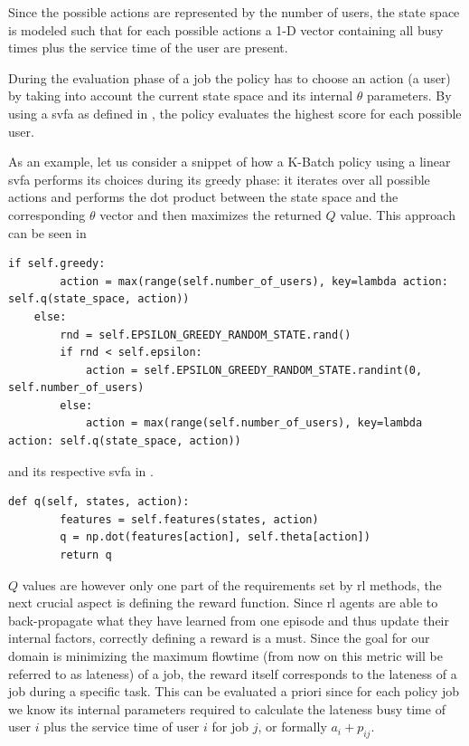 Since the possible actions are represented by the number of users, the state space is modeled such that for each possible actions a 1-D vector containing all busy times plus the service time of the user are present.

During the evaluation phase of a job the policy has to choose an action (\ie a user) by taking into account the current state space and its internal $\theta$ parameters. By using a \gls{svfa} as defined in , the policy evaluates the highest score for each possible user.

As an example, let us consider a snippet of how a K-Batch policy using a linear \gls{svfa} performs its choices during its greedy phase: it iterates over all possible actions and performs the dot product between the state space and the corresponding $\theta$ vector and then maximizes the returned $Q$ value. This approach can be seen in  

\begin{lstlisting}[caption=\gls{ep} approach,label=lst:e_greedy,style=CustomPython]
    if self.greedy:
        action = max(range(self.number_of_users), key=lambda action: self.q(state_space, action))
    else:
        rnd = self.EPSILON_GREEDY_RANDOM_STATE.rand()
        if rnd < self.epsilon:
            action = self.EPSILON_GREEDY_RANDOM_STATE.randint(0, self.number_of_users)
        else:
            action = max(range(self.number_of_users), key=lambda action: self.q(state_space, action))
\end{lstlisting}

and its respective \gls{svfa} in .

\begin{lstlisting}[caption=\glsentryfull{svfa},label=lst:value_f_approx,style=CustomPython]
    def q(self, states, action):
        features = self.features(states, action)
        q = np.dot(features[action], self.theta[action])
        return q
\end{lstlisting}
 
 $Q$ values are however only one part of the requirements set by \gls{rl} methods, the next crucial aspect is defining the reward function. Since \gls{rl} agents are able to back-propagate what they have learned from one episode and thus update their internal factors, correctly defining a reward is a must. Since the goal for our domain is minimizing the maximum flowtime (from now on this metric will be referred to as lateness) of a job, the reward itself corresponds to the lateness of a job during a specific task. This can be evaluated a priori since for each policy job we know its internal parameters required to calculate the lateness \ie busy time of user $i$ plus the service time of user $i$ for job $j$, or formally $a_i+p_{ij}$.

